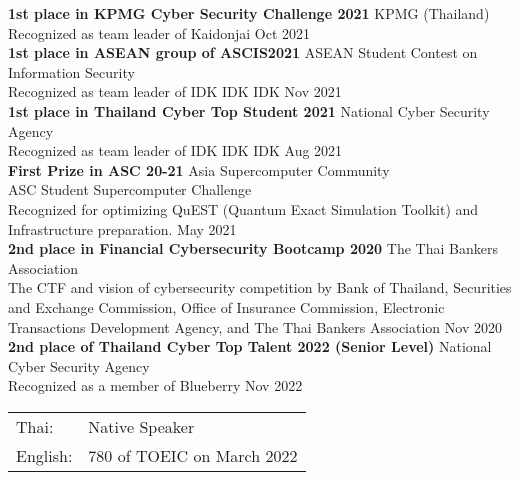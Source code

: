 \textbf{1st place in KPMG Cyber Security Challenge 2021} \hfill KPMG (Thailand)\\
Recognized as team leader of Kaidonjai \hfill Oct 2021\\
\vspace*{2mm}
\textbf{1st place in ASEAN group of ASCIS2021} \hfill ASEAN Student Contest on Information Security\\
Recognized as team leader of IDK IDK IDK \hfill Nov 2021\\
\vspace*{2mm}
\textbf{1st place in Thailand Cyber Top Student 2021} \hfill National Cyber Security Agency\\
Recognized as team leader of IDK IDK IDK \hfill Aug 2021\\
\vspace*{2mm}
\textbf{First Prize in ASC 20-21} \hfill Asia Supercomputer Community\\
ASC Student Supercomputer Challenge\\
Recognized for optimizing QuEST (Quantum Exact Simulation Toolkit) and Infrastructure preparation. \hfill May 2021\\
\vspace*{2mm}
\textbf{2nd place in Financial Cybersecurity Bootcamp 2020} \hfill The Thai Bankers\textquotesingle{} Association\\
The CTF and vision of cybersecurity competition by Bank of Thailand, Securities and Exchange Commission, Office of Insurance Commission, Electronic Transactions Development Agency, and The Thai Bankers\textquotesingle{} Association \hfill Nov 2020\\
\vspace*{2mm}
\textbf{2nd place of Thailand Cyber Top Talent 2022 (Senior Level)} \hfill National Cyber Security Agency\\
Recognized as a member of Blueberry \hfill Nov 2022\\
\vspace{2mm}

\begin{tabular}{ l l }
	Thai: & Native Speaker\\
	English:            & 780 of TOEIC on March 2022\\
\end{tabular}
\vspace{2mm}
